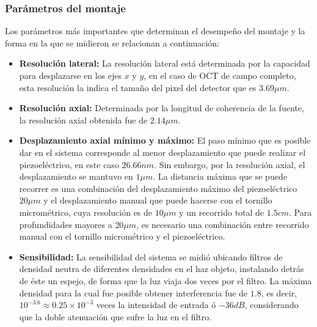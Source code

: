 \subsubsection{Parámetros del montaje}

Los parámetros más importantes que determinan el desempeño del montaje y la forma en la que se midieron se relacionan a continuación:

\begin{itemize}
\item \textbf{Resolución lateral:} La resolución lateral está determinada por la capacidad para desplazarse en los ejes $x$ y $y$, en el caso de OCT de campo completo, esta resolución la indica el tamaño del pixel del detector que es $3.69\mu m$. 

\item \textbf{Resolución axial:} Determinada por la longitud de coherencia de la fuente, la resolución axial obtenida fue de $2.14\mu m$.



\item \textbf{Desplazamiento axial mínimo y máximo:} El paso mínimo que es posible dar en el sistema corresponde al menor desplazamiento que puede realizar el piezoeléctrico, en este caso $26.66nm$. Sin embargo, por la resolución axial, el desplazamiento se mantuvo en $1\mu m$. La distancia máxima que se puede recorrer es una combinación del desplazamiento máximo del piezoeléctrico $20\mu m$ y el desplazamiento manual que puede hacerse con el tornillo micrométrico, cuya resolución es de $10\mu m$ y un recorrido total de $1.5cm$. Para profundidades mayores a $20\mu m$, es necesario una combinación entre recorrido manual con el tornillo micrométrico y el piezoeléctrico.

\item \textbf{Sensibilidad:} La sensibilidad del sistema se midió ubicando filtros de densidad neutra de diferentes densidades en el haz objeto, instalando detrás de éste un espejo, de forma que la luz viaja dos veces por el filtro. La máxima densidad para la cual fue posible obtener interferencia fue de $1.8$, es decir, $10^{-3.6}\approx 0.25\times 10^{-3}$ veces la intensidad de entrada ó $-36dB$, considerando que la doble atenuación que sufre la luz en el filtro.


\end{itemize}

